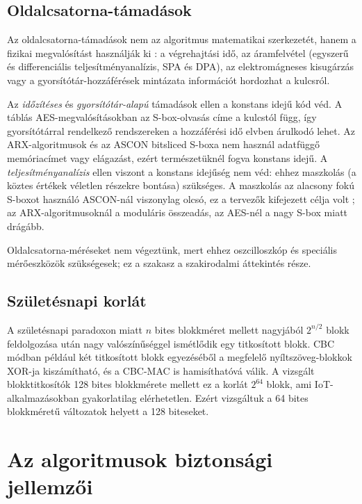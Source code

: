 \documentclass[a4paper,12pt]{report}
\theoremstyle{definition}
\theoremstyle{remark}
\begin{document}
\subsection{Oldalcsatorna-támadások}

Az oldalcsatorna-támadások nem az algoritmus matematikai szerkezetét, hanem a fizikai megvalósítást használják ki \cite{Kocher1996}: a végrehajtási idő, az áramfelvétel (egyszerű és differenciális teljesítményanalízis, SPA és DPA), az elektromágneses kisugárzás vagy a gyorsítótár-hozzáférések mintázata információt hordozhat a kulcsról.

Az \emph{időzítéses} és \emph{gyorsítótár-alapú} támadások ellen a konstans idejű kód véd. A táblás AES-megvalósításokban az S-box-olvasás címe a kulcstól függ, így gyorsítótárral rendelkező rendszereken a hozzáférési idő elvben árulkodó lehet. Az ARX-algoritmusok és az ASCON bitsliced S-boxa nem használ adatfüggő memóriacímet vagy elágazást, ezért természetüknél fogva konstans idejű. A \emph{teljesítményanalízis} ellen viszont a konstans idejűség nem véd: ehhez maszkolás (a köztes értékek véletlen részekre bontása) szükséges. A maszkolás az alacsony fokú S-boxot használó ASCON-nál viszonylag olcsó, ez a tervezők kifejezett célja volt \cite{Dobraunig2021}; az ARX-algoritmusoknál a moduláris összeadás, az AES-nél a nagy S-box miatt drágább.

Oldalcsatorna-méréseket nem végeztünk, mert ehhez oszcilloszkóp és speciális mérőeszközök szükségesek; ez a szakasz a szakirodalmi áttekintés része.

\subsection{Születésnapi korlát}\label{sec:birthday}

A születésnapi paradoxon miatt $n$ bites blokkméret mellett nagyjából $2^{n/2}$ blokk feldolgozása után nagy valószínűséggel ismétlődik egy titkosított blokk. CBC módban például két titkosított blokk egyezéséből a megfelelő nyíltszöveg-blokkok XOR-ja kiszámítható, és a CBC-MAC is hamisíthatóvá válik. A vizsgált blokktitkosítók 128 bites blokkmérete mellett ez a korlát $2^{64}$ blokk, ami IoT-alkalmazásokban gyakorlatilag elérhetetlen. Ezért vizsgáltuk a 64 bites blokkméretű változatok helyett a 128 biteseket.

\section{Az algoritmusok biztonsági jellemzői}\label{sec:alg_security}
\end{document}
